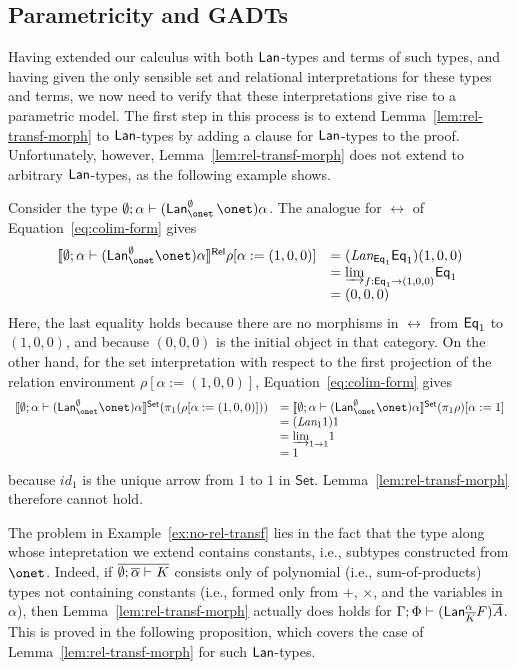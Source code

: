 \documentclass{lmcs}
\theoremstyle{plain}\newtheorem{satz}[thm]{Satz}
\newcommand{\set}{\mathsf{Set}}
\renewcommand{\id}{\mathit{id}}
\begin{document}
\subsection{Parametricity and GADTs}

Having extended our calculus with both $\mathsf{Lan}$-types and terms of such
types, and having given the only sensible set and relational
interpretations for these types and terms, we now need to verify that
these interpretations give rise to a parametric model. The first step
in this process is to extend Lemma~\ref{lem:rel-transf-morph} to
$\mathsf{Lan}$-types by adding a clause for $\mathsf{Lan}$-types to the proof.
Unfortunately, however, Lemma~\ref{lem:rel-transf-morph} does not
extend to arbitrary $\mathsf{Lan}$-types, as the following example shows.

\begin{exa}\label{ex:no-rel-transf}
Consider the type $\emptyset; \alpha \vdash
(\Lan^{\emptyset}_{\onet}\, \onet) \alpha$. The analogue for $\rel$ of
Equation~\ref{eq:colim-form} gives
\[
\begin{array}{rl}
\relsem{ \emptyset; \alpha \vdash (\Lan^{\emptyset}_{\onet} \onet)
  \alpha } \rho [\alpha := (1, 0, 0)] 
&= (\textit{Lan}_{\Eq_1} \Eq_1)(1, 0, 0) \\
&= \colim{f : \Eq_1 \to (1, 0, 0)}{\Eq_1} \\
&= (0, 0, 0)
\end{array}
\]
Here, the last equality holds because there are no morphisms in $\rel$
from $\mathsf{Eq}_1$ to $(1, 0, 0)$, and because $(0,0,0)$ is the initial
object in that category. On the other hand, for the set interpretation
with respect to the first projection of the relation environment
$\rho[\alpha := (1,0,0)]$, Equation~\ref{eq:colim-form} gives
\[
\begin{array}{rl}
\setsem{ \emptyset; \alpha \vdash (\Lan^{\emptyset}_{\onet} \onet)
  \alpha } ( \pi_1 ( \rho [\alpha := (1, 0, 0)] ) ) 
&= \setsem{ \emptyset; \alpha \vdash (\Lan^{\emptyset}_{\onet} \onet)
  \alpha } (\pi_1 \rho) [\alpha := 1] \\ 
&= (\textit{Lan}_{1} 1) 1 \\
&= \colim{1 \to 1}{1} \\
&= 1
\end{array}
\]
because $\id_1$ is the unique arrow from $1$ to $1$ in $\set$.
Lemma~\ref{lem:rel-transf-morph} therefore cannot hold.
\end{exa}

The problem in Example~\ref{ex:no-rel-transf} lies in the fact that
the type along whose intepretation we extend contains constants, i.e.,
subtypes constructed from $\onet$. Indeed, if $\overline{\emptyset;
  \overline{\alpha} \vdash K}$ consists only of polynomial (i.e.,
sum-of-products) types not containing constants (i.e., formed only
from $+$, $\times$, and the variables in $\alpha$), then
Lemma~\ref{lem:rel-transf-morph} actually does holds for $\Gamma; \Phi
\vdash (\mathsf{Lan}^{\alpha}_{\overline{K}} F)\overline{A}$. This is proved in the
following proposition, which covers the case of
Lemma~\ref{lem:rel-transf-morph} for such $\mathsf{Lan}$-types.
\end{document}
